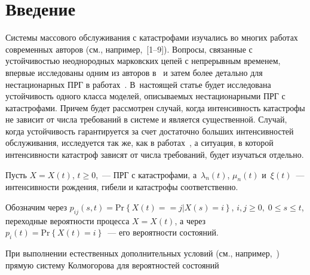       \begin{multicols}{2}

      \label{st\stat}

\section{Введение}

Системы массового обслуживания с катастрофами изучались во многих
работах современных авторов  (см., например,~[1--9]). Вопросы, связанные с
устойчивостью неоднородных марковских цепей  с непрерывным временем,
впервые исследованы одним из авторов в~\cite{z85} и затем более
детально для нестационарных ПРГ в
работах~\cite{z98, ae}. В~настоящей статье будет исследована
устойчивость одного класса моделей, описываемых нестационарными ПРГ
с катастрофами. Причем будет рассмотрен случай, когда интенсивность
катастрофы не зависит от числа требований в системе и является
существенной. Случай, когда устойчивость гарантируется за счет
достаточно больших интенсивностей обслуживания, исследуется так же,
как в работах~\cite{z98, ae}, а ситуация, в которой интенсивности
катастроф зависят от числа требований, будет изучаться отдельно.


Пусть $X=X(t)$, $t\geq 0$,~--- ПРГ с катастрофами, а~$\lambda_n(t)$,
$\mu_n(t)$ и~$\xi (t)$~--- интенсивности рождения, гибели и
катастрофы  соответственно.

Обозначим через $p_{ij}(s,t)=\mathrm{Pr}\left\{ X(t)=\right.$\linebreak $\left.=j\left| X(s)=i\right.
\right\}$, $i,j \ge 0, \;0\leq s\leq t$, переходные вероятности
процесса $X=X(t)$, а через  $p_i(t)=\mathrm{Pr}\left\{ X(t) =i \right\}$~---
его вероятности состояний.

При выполнении естественных дополнительных условий (см., например,~\cite{z08b}) 
прямую систему Колмогорова для вероятностей состояний


\end{multicols}
